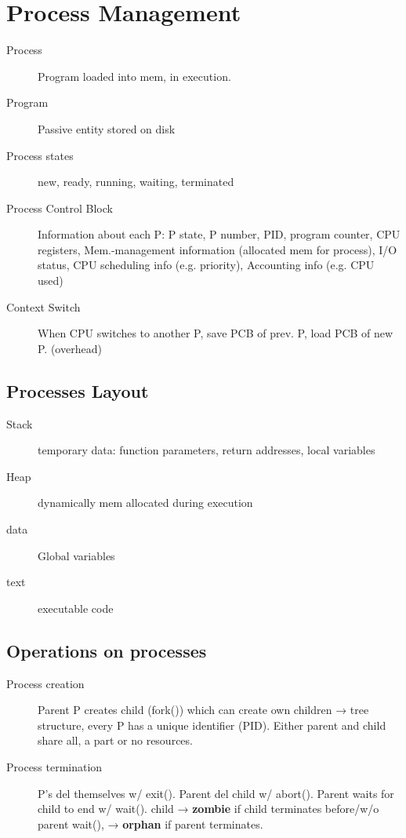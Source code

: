 \section*{Process Management}
\begin{description}
    \item[Process] Program loaded into mem, in execution.
  \item[Program] Passive entity stored on disk
  \item[Process states] new, ready, running, waiting, terminated
  \item[Process Control Block] Information about each P: P state, P number, PID, program counter, CPU registers, Mem.-management information (allocated mem for process), I/O status, CPU scheduling info (e.g. priority), Accounting info (e.g. CPU used)
  \item[Context Switch] When CPU switches to another P, save PCB of prev. P, load PCB of new P. (overhead)
\end{description}

\subsection*{Processes Layout}
\begin{description}
  \item[Stack] temporary data: function parameters, return addresses, local variables
  \item[Heap] dynamically mem allocated during execution
  \item[data] Global variables
  \item[text] executable code
\end{description}

\subsection*{Operations on processes}
\begin{description}
  \item[Process creation]Parent P creates child (fork()) which can create own children → tree structure, every P has a unique identifier (PID). Either parent and child share all, a part or no resources.
  \item[Process termination] P's del themselves w/ exit(). Parent del child w/ abort(). Parent waits for child to end w/ wait(). child → \textbf{zombie} if child terminates before/w/o parent wait(), → \textbf{orphan} if parent terminates.
\end{description}

